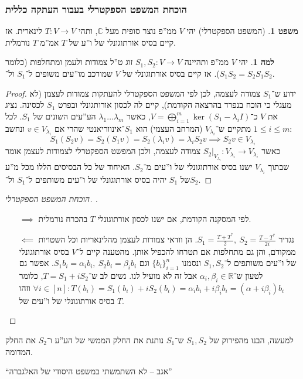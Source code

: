 \documentclass[a4paper]{article}
\newcommand\R     {\mathbb{R}}
\newcommand\C     {\mathbb{C}}
\newcommand\co        {\colon}
\newcommand\ag        {\alpha}
\newcommand\bg        {\beta}
\renewcommand\lg      {\lambda}
\theoremstyle{definition}
\newtheorem{Theorem}{משפט}
\newtheorem{Lemma}{למה}
\newcommand\theo  [1] {\begin{Theorem}#1\end{Theorem}}
\newcommand\lem   [1] {\begin{Lemma}#1\end{Lemma}}
\begin{document}
	\subsubsection{הוכחת המשפט הספקטרלי בעבור העתקה כללית}
	\theo{(המשפט הספקטרלי) יהי $V$ ממ''פ נוצר סופית מעל $\C$, ותהי $T \co V \to V$ לינארית. אז קיים בסיס אורתוגונלי של ו''ע של $T$ אמ''מ $T$ נורמלית. }
	\lem{יהי $V$ ממ''פ ותהיינה $S_1, S_2 \co V \to V$  זוג ט''ל צמודות ולעמן ומתחלפות (כלומר $S_1S_2 = S_2 S_1$). אז קיים בסיס אורתוגונלי של $V$ שמורכב מו''עים משופים ל־$S_1$ ול־$S_2$. }\begin{proof}
		ידוע ש־$S_1$ צמודה לעצמה, לכן לפי המשפט הספקטרלי להעתקות צמודות לעצמן (לא מעגלי כי הוכח בנפרד בהרצאה הקודמת), קיים לה לכסון אורותגונלי ובפרט $S_1$ לכסינה. נציג את $V$ כ־$V = \bigoplus_{i = 1}^{m} \ker(S_1 - \lg_iI)$, כאשר $\lg _1 \dots \lg_m$ הע''עים השונים של $S_1$. לכל $1 \le i \le m$  מתקיים ש־$V_{\lg_i}$ (המרחב העצמי) הוא $S_1$־אינווריאנטי שהרי אם $v \in V_{\lg_i}$ ונחשב: 
		\[ S_1(S_2 v) = S_2(S_1 v) = S_2(\lg_i v) = \lg _i S_2v \implies S_2 v \in V_{\lg_i} \]
		כאשר $S_2|_{V_{\lg _i}} \co V_{\lg_i} \to V_{\lg_i}$ צמודה לעצמה, ולכן המפשט הספקטרלי לצמודות לעצמן אומר שבתוך $V_{\lg_i}$ ישנו בסיס אורתוגונלי של ו''עים מ־$S_2$. האיחוד של כל הבסיסים הללו מכל מ''ע של $S_1$ יהיה בסיס אורתוגונלי של ו''עים משותפים ל־$S_1$ ול־$S_2$. 
	\end{proof}
	\begin{proof}[הוכחת המשפט הספקטרלי. ]\,
		\begin{itemize}
			\item[$\implies$] לפי המסקנה הקודמת, אם ישנו לכסון אורתוגונלי $T$ בהכרח נורמלית. 
			\item[$\impliedby$] נגדיר $S_1 = \frac{T + T^*}{2}, \ S_2 = \frac{T - T^*}{2i}$. הן וודאי צמודות לעצמן מהלינאריות וכל השטויות ממקודם, והן גם מתחלפות אם תטרחו להכפיל אותן. מהטענה קיים ל־$V$ בסיס אורתוגונלי של ו''עים משותפים ל־$S_1, S_2$ ונסמנו $\{b_i\}^{n}_{i = 1}$ וגם $S_1b_i = \ag_i b_i, \ S_2b_i= \bg_i b_i$. אפשר גם לטעון ש־$\ag_i, \bg_i \in \R$ אבל זה לא מועיל לנו. נשים לב ש־$T = S_1 + iS_2$, כלומר $\forall i \in [n] \co T(b_i) = S_1(b_i) + iS_2(b_i) = \ag_i b_i + i\bg_i b_i = (\ag + i\bg_i)b_i$ וזהו בסיס אורתוגונלי של ו''עים של $T$. 
		\end{itemize}
	\end{proof}
	
	למעשה, הבנו מהפירוק של $S_1, S_2$ ש־$S_1$ נותנת את החלק הממשי של הע''ע ו־$S_2$ את החלק המדומה. 
	
	``אגב – לא השתמשתי במשפט היסודי של האלגברה''
	
\end{document}
